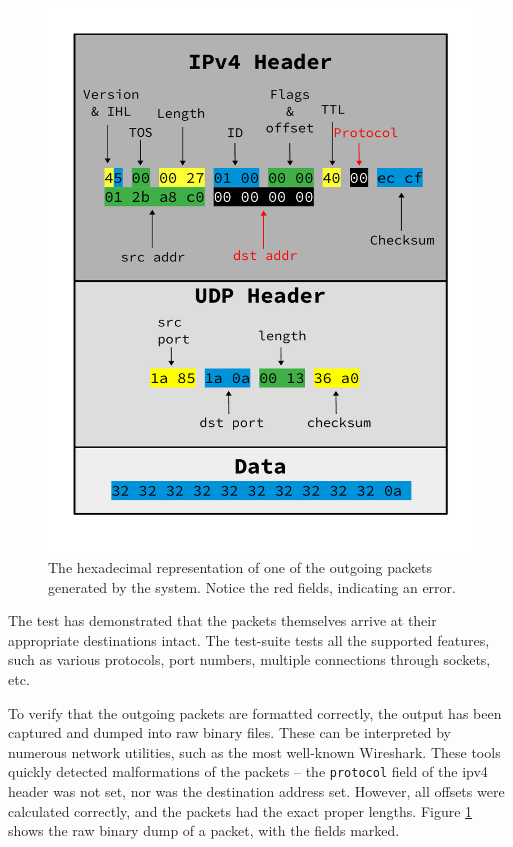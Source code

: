 \begin{figure}[h]
\centering
\includegraphics[width=\linewidth]{evaluation/hexdump.pdf}
	\caption{The hexadecimal representation of one of the outgoing packets
	generated by the system. Notice the red fields, indicating an error.}
\label{fig:packet_hexdump}
\end{figure}

The test has demonstrated that the packets themselves arrive at their
appropriate destinations intact. The test-suite tests all the supported
features, such as various protocols, port numbers, multiple connections through
sockets, etc.

To verify that the outgoing packets are formatted correctly, the output has
been captured and dumped into raw binary files. These can be interpreted by
numerous network utilities, such as the most well-known Wireshark.
These tools quickly detected malformations of the packets -- the
\texttt{protocol} field of the \gls{ipv4} header was not set, nor was the
destination address set. However, all offsets were calculated correctly, and
the packets had the exact proper lengths. Figure
\ref{fig:packet_hexdump} shows the raw binary dump of a packet, with the fields
marked.



